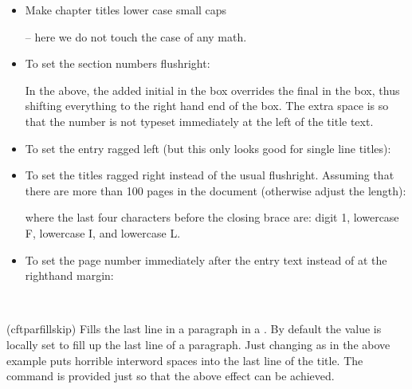 \begin{itemize}
\item Make chapter titles lower case small caps
  \begin{lcode}
    \renewcommand\cftchapterfont{\scshape\MakeTextLowercase}
  \end{lcode}
  -- here we do not touch the case of any math.

 \item To set the section numbers flushright:
 \begin{lcode}
 \setlength{\mylen}{0.5em}    %
 \renewcommand{\cftKpresnum}{\hfill} %
 \renewcommand{\cftKaftersnum}{\hspace*{\mylen}}
 \addtolength{\cftKnumwidth}{\mylen}
 \end{lcode}
 In the above, the added initial \cmd{\hfill} in the box overrides the
 final \cmd{\hfil} in the box, thus shifting everything to the right hand
 end of the box. The extra space is so that the number is not typeset
 immediately at the left of the title text.

 \item To set the entry ragged left (but this only looks good for single
       line titles):
 \begin{lcode}
 \renewcommand{\cftKfont}{\hfill\bfseries}
 \renewcommand{\cftKleader}{}
 \end{lcode}

\item To set the titles ragged right instead of the usual flushright.
      Assuming that there are more than 100 pages in the document (otherwise
      adjust the length):
\begin{lcode}
\end{lcode}
where the last four characters before the closing brace are: digit 1, 
lowercase F, lowercase I, and lowercase L.

 \item To set the page number immediately after the entry text instead of at
       the righthand margin:
 \begin{lcode}
 \renewcommand{\cftKleader}{}
 \renewcommand{\cftKafterpnum}{\cftparfillskip}
 \end{lcode}

\end{itemize}

\begin{syntax}
\cmd{\cftparfillskip} \\
\end{syntax}
\glossary(cftparfillskip)%
  {}%
  {Fills the last line in a paragraph in a \listofx.}
 By default the \cmd{\parfillskip} value is locally set to fill up the last
 line of a paragraph. Just changing \cmd{\cftKleader} as
in the above example puts horrible interword
 spaces into the last line of the title. The \cmd{\cftparfillskip} 
 command  is provided just so that the above effect can be achieved.

